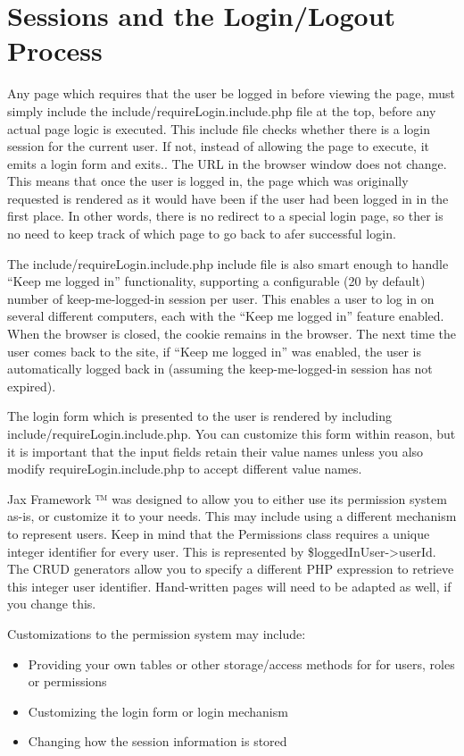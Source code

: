 \documentclass[letterpaper,10pt,english]{sphinxmanual}
\begin{document}
\section{Sessions and the Login/Logout Process}
\label{jaxFrameworkGuide:sessions-and-the-login-logout-process}
Any page which requires that the user be logged in before viewing the page, must simply include the
include/requireLogin.include.php file at the top, before any actual page logic is executed.  This
include file checks whether there is a login session for the current user.  If not, instead of
allowing the page to execute, it emits a login form and exits..  The URL in the browser window does
not change.  This means that once the user is logged in, the page which was originally requested is
rendered as it would have been if the user had been logged in in the first place.  In other words,
there is no redirect to a special login page, so ther is no need to keep track of which page to go
back to afer successful login.

The include/requireLogin.include.php include file is also smart enough to handle ``Keep me logged in''
functionality, supporting a configurable (20 by default) number of keep-me-logged-in session per
user.  This enables a user to log in on several different computers, each with the ``Keep me logged
in'' feature enabled.  When the browser is closed, the cookie remains in the browser.  The next time
the user comes back to the site, if ``Keep me logged in'' was enabled, the user is automatically
logged back in (assuming the keep-me-logged-in session has not expired).

The login form which is presented to the user is rendered by including
include/requireLogin.include.php.  You can customize this form within reason, but it is important
that the input fields retain their value names unless you also modify requireLogin.include.php to
accept different value names.

Jax Framework ™ was designed to allow you to either use its permission system as-is, or
customize it to your needs.  This may include using a different mechanism to represent users.  Keep
in mind that the Permissions class requires a unique integer identifier for every user.  This is
represented by \$loggedInUser-\textgreater{}userId.  The CRUD generators allow you to specify a different PHP
expression to retrieve this integer user identifier.  Hand-written pages will need to be adapted as
well, if you change this.

Customizations to the permission system may include:
\begin{itemize}
\item {} 
Providing your own tables or other storage/access methods for for users, roles or permissions

\item {} 
Customizing the login form or login mechanism

\item {} 
Changing how the session information is stored

\end{itemize}
\end{document}
